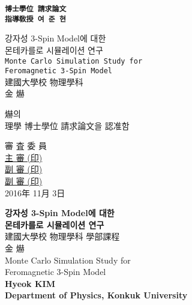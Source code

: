 \begin{titlingpage} 
\begin{flushleft}
 \Large\textbf{\texttt{博士學位 請求論文\\
 指導敎授 여 준 현}}
\end{flushleft}
\vspace*{27mm}
\begin{center}
{\huge 강자성 3-Spin Model에 대한\\[3mm]
몬테카를로 시뮬레이션 연구 }\\[30mm]
\texttt{\Large Monte Carlo Simulation Study for\\
Feromagnetic 3-Spin Model}\\
\vspace{70mm}
{\huge 建國大學校 物理學科\\[20pt]
\huge 金 爀}
\end{center} 
\clearpage
 \begin{flushleft}
 爀의 \\
理學 博士學位 請求論文을 認准함
 \end{flushleft}
 \vspace{30mm}
 \begin{center}\Large
  審 査 委 員 \\[30pt]
  \underline{主 審 \hspace{0.45\textwidth}(印)}\\
  \vspace*{10mm}
\underline{副 審 \hspace{0.45\textwidth}(印)}\\
  \vspace*{10mm}
\underline{副 審 \hspace{0.45\textwidth}(印)}\\
\vspace*{30mm}
2016年 11月 3日\\
\vspace*{25mm}
 \end{center}
\clearpage
\begin{center}
\vspace*{0mm}
\textbf{\huge 강자성 3-Spin Model에 대한\\[3mm]
몬테카를로 시뮬레이션 연구 }\\[40mm]
建國大學校 物理學科 學部課程 \\[20mm]
金 爀 \\[28mm]
{\Large Monte Carlo Simulation Study for \\
Feromagnetic 3-Spin Model} \\[30mm]
\textbf{Hyeok KIM \\
Department of Physics, Konkuk University }
 \end{center}
\end{titlingpage}
